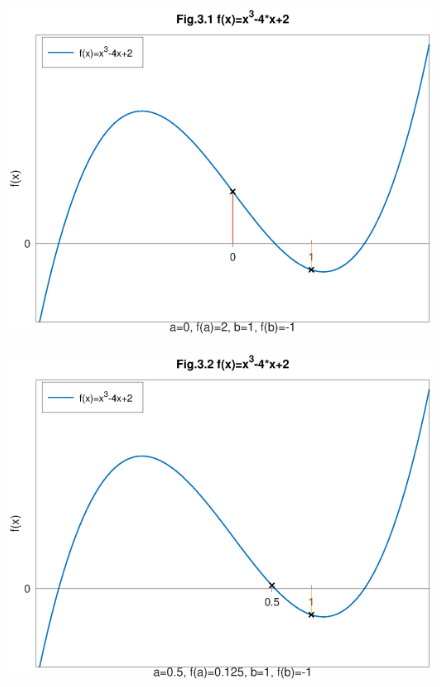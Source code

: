 \documentclass[12pt]{article}
\begin{document}
\begin{figure}[htbp]
    \begin{center}
        \includegraphics[height=90mm]{octave-fig/Fig.3.1.eps}
        \includegraphics[height=90mm]{octave-fig/Fig.3.2.eps}
    \end{center}
\end{figure}
\end{document}
